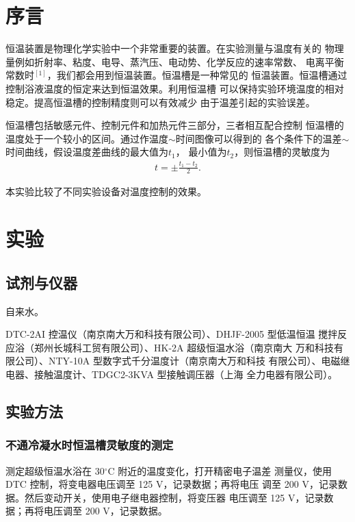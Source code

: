 \documentclass[12pt]{ctexart}
\numberwithin{equation}{section}
\begin{document}
\section{序言}

恒温装置是物理化学实验中一个非常重要的装置。在实验测量与温度有关的
物理量例如折射率、粘度、电导、蒸汽压、电动势、化学反应的速率常数、
电离平衡常数时$^{[1]}$，我们都会用到恒温装置。恒温槽是一种常见的
恒温装置。恒温槽通过控制浴液温度的恒定来达到恒温效果。利用恒温槽
可以保持实验环境温度的相对稳定。提高恒温槽的控制精度则可以有效减少
由于温差引起的实验误差。

恒温槽包括敏感元件、控制元件和加热元件三部分，三者相互配合控制
恒温槽的温度处于一个较小的区间。通过作温度$\sim$时间图像可以得到的
各个条件下的温差$\sim$时间曲线，假设温度差曲线的最大值为$t_1$，
最小值为$t_2$，则恒温槽的灵敏度为
\begin{align}
    t = \pm \frac{t_1 - t_2}{2}.
\end{align}

本实验比较了不同实验设备对温度控制的效果。

\section{实验}
\subsection{试剂与仪器}

自来水。

DTC-2AI 控温仪（南京南大万和科技有限公司）、DHJF-2005 型低温恒温
搅拌反应浴（郑州长城科工贸有限公司）、HK-2A 超级恒温水浴（南京南大
万和科技有限公司）、NTY-10A 型数字式千分温度计（南京南大万和科技
有限公司）、电磁继电器、接触温度计、TDGC2-3KVA 型接触调压器（上海
全力电器有限公司）。

\subsection{实验方法}
\subsubsection{不通冷凝水时恒温槽灵敏度的测定}

测定超级恒温水浴在 30$^\circ$C 附近的温度变化，打开精密电子温差
测量仪，使用 DTC 控制，将变电器电压调至 125 V，记录数据；再将电压
调至 200 V，记录数据。然后变动开关，使用电子继电器控制，将变压器
电压调至 125 V，记录数据；再将电压调至 200 V，记录数据。
\end{document}
